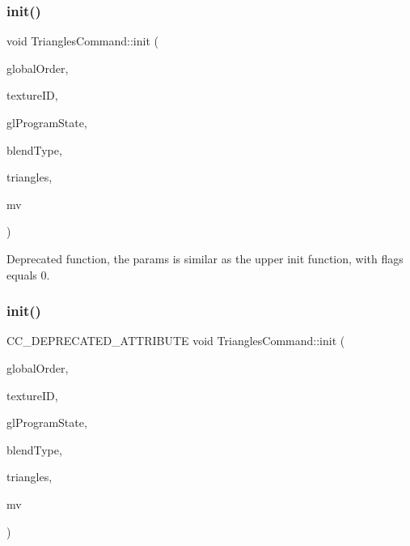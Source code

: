 \subsubsection{\texorpdfstring{init()}{init()}\hspace{0.1cm}{\footnotesize\ttfamily [3/4]}}
{\footnotesize\ttfamily void Triangles\+Command\+::init (\begin{DoxyParamCaption}\item[{float}]{global\+Order,  }\item[{G\+Luint}]{texture\+ID,  }\item[{\hyperlink{classGLProgramState}{G\+L\+Program\+State} $\ast$}]{gl\+Program\+State,  }\item[{\hyperlink{structBlendFunc}{Blend\+Func}}]{blend\+Type,  }\item[{const \hyperlink{structTrianglesCommand_1_1Triangles}{Triangles} \&}]{triangles,  }\item[{const \hyperlink{classMat4}{Mat4} \&}]{mv }\end{DoxyParamCaption})}

Deprecated function, the params is similar as the upper init function, with flags equals 0. \mbox{\label{classTrianglesCommand_a5cfa104642ee63bd61bc50062d546f3a}} 
\subsubsection{\texorpdfstring{init()}{init()}\hspace{0.1cm}{\footnotesize\ttfamily [4/4]}}
{\footnotesize\ttfamily C\+C\+\_\+\+D\+E\+P\+R\+E\+C\+A\+T\+E\+D\+\_\+\+A\+T\+T\+R\+I\+B\+U\+TE void Triangles\+Command\+::init (\begin{DoxyParamCaption}\item[{float}]{global\+Order,  }\item[{G\+Luint}]{texture\+ID,  }\item[{\hyperlink{classGLProgramState}{G\+L\+Program\+State} $\ast$}]{gl\+Program\+State,  }\item[{\hyperlink{structBlendFunc}{Blend\+Func}}]{blend\+Type,  }\item[{const \hyperlink{structTrianglesCommand_1_1Triangles}{Triangles} \&}]{triangles,  }\item[{const \hyperlink{classMat4}{Mat4} \&}]{mv }\end{DoxyParamCaption})}

